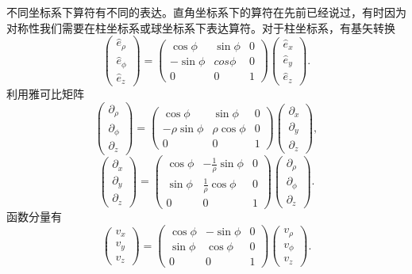 \documentclass[UTF8]{ctexbook}
\numberwithin{equation}{chapter}
\begin{document}
	不同坐标系下算符有不同的表达。直角坐标系下的算符在先前已经说过，有时因为对称性我们需要在柱坐标系或球坐标系下表达算符。对于柱坐标系，有基矢转换
	\[\begin{pmatrix} \hat{e}_\rho \\ \hat{e}_\phi \\ \hat{e}_z\end{pmatrix} = \begin{pmatrix} \cos\phi &  \sin \phi& 0 \\ -\sin\phi & cos\phi & 0 \\ 0 & 0 & 1\end{pmatrix} \begin{pmatrix} \hat{e}_x \\ \hat{e}_y \\ \hat{e}_z\end{pmatrix}.\]
	利用雅可比矩阵
	\[\begin{pmatrix} \partial_\rho \\ \partial_\phi \\ \partial_z \end{pmatrix}=\begin{pmatrix} \cos\phi & \sin\phi & 0 \\ -\rho\sin\phi & \rho\cos\phi & 0 \\ 0 & 0 & 1\end{pmatrix}\begin{pmatrix} \partial_x \\ \partial_y \\ \partial_z \end{pmatrix}, \]
	\[\begin{pmatrix} \partial_x \\ \partial_y\\ \partial_z \end{pmatrix}=\begin{pmatrix} \cos\phi & -\frac{1}{\rho}\sin\phi & 0 \\ \sin\phi & \frac{1}{\rho}\cos\phi & 0 \\ 0 & 0 & 1\end{pmatrix}\begin{pmatrix} \partial_\rho \\ \partial_\phi \\ \partial_z \end{pmatrix}.\]
	函数分量有
	\[\begin{pmatrix} v_x \\ v_y \\ v_z\end{pmatrix} = \begin{pmatrix} \cos\phi & -\sin\phi & 0 \\ \sin\phi & \cos\phi & 0 \\ 0 & 0 & 1 \end{pmatrix}\begin{pmatrix} v_\rho \\ v_\phi \\ v_z\end{pmatrix}.\]
\end{document}
